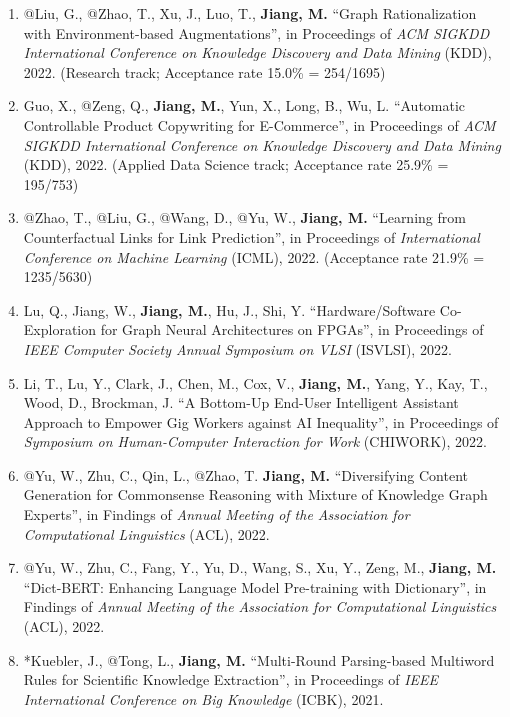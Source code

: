 \documentclass[10pt]{article}
\newenvironment{myindentpar}[1]%
{\begin{list}{}%
         {\setlength{\leftmargin}{#1}}%
         \item[]%
}
{\end{list}}
\newcounter{list}
\begin{document}
\begin{myindentpar}{0.00cm}
\begin{enumerate}[leftmargin=.5cm]
\item[C70] @Liu, G., @Zhao, T., Xu, J., Luo, T., \textbf{Jiang, M.} ``Graph Rationalization with Environment-based Augmentations'', in Proceedings of \textit{ACM SIGKDD International Conference on Knowledge Discovery and Data Mining} (KDD), 2022. (Research track; Acceptance rate 15.0\% = 254/1695)

\item[C69] Guo, X., @Zeng, Q., \textbf{Jiang, M.}, Yun, X., Long, B., Wu, L. ``Automatic Controllable Product Copywriting for E-Commerce'', in Proceedings of \textit{ACM SIGKDD International Conference on Knowledge Discovery and Data Mining} (KDD), 2022. (Applied Data Science track; Acceptance rate 25.9\% = 195/753)

\item[C68] @Zhao, T., @Liu, G., @Wang, D., @Yu, W., \textbf{Jiang, M.} ``Learning from Counterfactual Links for Link Prediction'', in Proceedings of \textit{International Conference on Machine Learning} (ICML), 2022. (Acceptance rate 21.9\% = 1235/5630)

\item[C67] Lu, Q., Jiang, W., \textbf{Jiang, M.}, Hu, J., Shi, Y. ``Hardware/Software Co-Exploration for Graph Neural Architectures on FPGAs'', in Proceedings of \textit{IEEE Computer Society Annual Symposium on VLSI} (ISVLSI), 2022.

\item[C66] Li, T., Lu, Y., Clark, J., Chen, M., Cox, V., \textbf{Jiang, M.}, Yang, Y., Kay, T., Wood, D., Brockman, J. ``A Bottom-Up End-User Intelligent Assistant Approach to Empower Gig Workers against AI Inequality'', in Proceedings of \textit{Symposium on Human-Computer Interaction for Work} (CHIWORK), 2022.
		
\item[C65] @Yu, W., Zhu, C., Qin, L., @Zhao, T. \textbf{Jiang, M.} ``Diversifying Content Generation for Commonsense Reasoning with Mixture of Knowledge Graph Experts'', in Findings of \textit{Annual Meeting of the Association for Computational Linguistics} (ACL), 2022.

\item[C64] @Yu, W., Zhu, C., Fang, Y., Yu, D., Wang, S., Xu, Y., Zeng, M., \textbf{Jiang, M.} ``Dict-BERT: Enhancing Language Model Pre-training with Dictionary'', in Findings of \textit{Annual Meeting of the Association for Computational Linguistics} (ACL), 2022.

\item[C63] *Kuebler, J., @Tong, L., \textbf{Jiang, M.} ``Multi-Round Parsing-based Multiword Rules for Scientific Knowledge Extraction'', in Proceedings of \textit{IEEE International Conference on Big Knowledge} (ICBK), 2021.
		

\end{enumerate}
\end{myindentpar}
\end{document}

